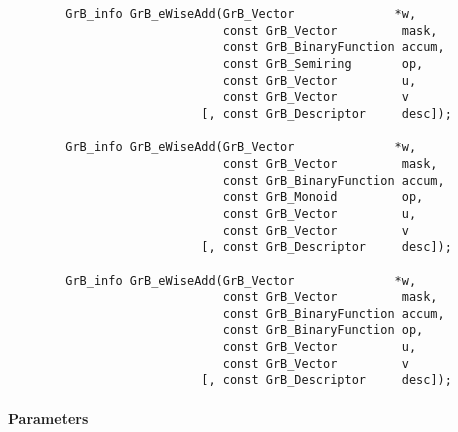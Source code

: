 \begin{verbatim}
        GrB_info GrB_eWiseAdd(GrB_Vector              *w,
                              const GrB_Vector         mask,
                              const GrB_BinaryFunction accum,
                              const GrB_Semiring       op, 
                              const GrB_Vector         u,
                              const GrB_Vector         v
                           [, const GrB_Descriptor     desc]);
                            
        GrB_info GrB_eWiseAdd(GrB_Vector              *w,
                              const GrB_Vector         mask,
                              const GrB_BinaryFunction accum,
                              const GrB_Monoid         op, 
                              const GrB_Vector         u,
                              const GrB_Vector         v
                           [, const GrB_Descriptor     desc]);
                            
        GrB_info GrB_eWiseAdd(GrB_Vector              *w,
                              const GrB_Vector         mask,
                              const GrB_BinaryFunction accum,
                              const GrB_BinaryFunction op, 
                              const GrB_Vector         u,
                              const GrB_Vector         v
                           [, const GrB_Descriptor     desc]);
\end{verbatim}

\paragraph{Parameters}

